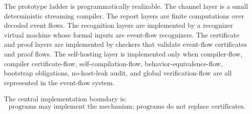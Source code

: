The prototype ladder is programmatically realizable. The channel layer is a small deterministic streaming compiler. The report layers are finite computations over decoded event flows. The recognition layers are implemented by a recognizer virtual machine whose formal inputs are event-flow recognizers. The certificate and proof layers are implemented by checkers that validate event-flow certificates and proof flows. The self-hosting layer is implemented only when compiler-flow, compiler certificate-flow, self-compilation-flow, behavior-equivalence-flow, bootstrap obligations, no-host-leak audit, and global verification-flow are all represented in the event-flow system.

The central implementation boundary is:
$$
  \boxed{\text{programs may implement the mechanism; programs do not replace certificates}.}
$$
